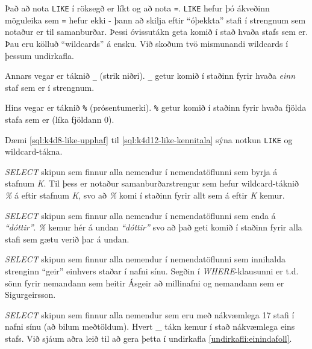 Það að nota \verb|LIKE| í röksegð er líkt og að nota \verb|=|. \verb|LIKE| hefur þó ákveðinn möguleika sem \verb|=| hefur ekki - þann að skilja eftir ``óþekkta'' stafi í strengnum sem notaður er til samanburðar. Þessi óvissutákn geta komið í stað hvaða stafs sem er. Þau eru kölluð ``wildcards'' á ensku. Við skoðum tvö mismunandi wildcards í þessum undirkafla. 

Annars vegar er táknið \verb|_| (strik niðri). \verb|_| getur komið í staðinn fyrir hvaða \emph{einn} staf sem er í strengnum.

Hins vegar er táknið \verb|%| (prósentumerki). \verb|%| getur komið í staðinn fyrir hvaða fjölda stafa sem er (líka fjöldann $0$).

Dæmi \ref{sql:k4d8-like-upphaf} til \ref{sql:k4d12-like-kennitala} sýna notkun \verb|LIKE| og wildcard-tákna.

\begin{example}
\caption[LIKE til að finna orð sem byrja á sama staf]{\emph{SELECT} skipun sem finnur alla nemendur í nemendatöflunni sem byrja á stafnum \emph{K}. Til þess er notaður samanburðarstrengur sem hefur wildcard-táknið \emph{\%} á eftir stafnum \emph{K}, svo að \emph{\%} komi í staðinn fyrir allt sem á eftir \emph{K} kemur.}
\label{sql:k4d8-like-upphaf}
\centering
{}
\end{example}

\begin{example}
\caption[LIKE til að finna orð sem enda eins]{\emph{SELECT} skipun sem finnur alla nemendur í nemendatöflunni sem enda á \emph{``dóttir''}. \emph{\%} kemur hér á undan \emph{``dóttir''} svo að það geti komið í staðinn fyrir alla stafi sem gætu verið þar á undan.}
\label{sql:k4d9-like-lok}
\centering
{}
\end{example}

\begin{example}
\caption[LIKE einhvers staðar í streng]{\emph{SELECT} skipun sem finnur alla nemendur í nemendatöflunni sem innihalda strenginn ``geir'' einhvers staðar í nafni sínu. Segðin í \emph{WHERE}-klausunni er t.d. sönn fyrir nemandann sem heitir Ásgeir að millinafni og nemandann sem er Sigurgeirsson.}
\label{sql:k4d10-like-midja}
\centering
{}
\end{example}

\begin{example}
\caption[LIKE til að finna strengi af ákveðinni lengd]{\emph{SELECT} skipun sem finnur alla nemendur sem eru með nákvæmlega 17 stafi í nafni sínu (að bilum meðtöldum). Hvert \_ tákn kemur í stað nákvæmlega eins stafs. Við sjáum aðra leið til að gera þetta í undirkafla \ref{undirkafli:einindafoll}.}
\label{sql:k4d11-like-nakvaemt}
\centering
{}
\end{example}

